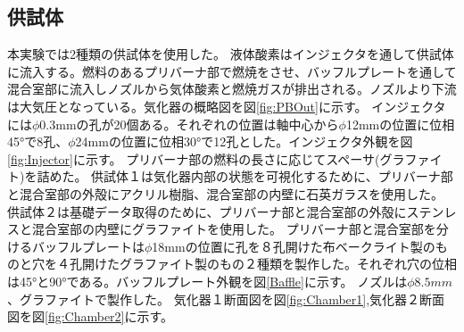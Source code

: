 \subsection{供試体}
本実験では2種類の供試体を使用した。
液体酸素はインジェクタを通して供試体に流入する。燃料のあるプリバーナ部で燃焼をさせ、バッフルプレートを通して混合室部に流入しノズルから気体酸素と燃焼ガスが排出される。ノズルより下流は大気圧となっている。気化器の概略図を図\ref{fig:PBOut}に示す。
インジェクタには$\phi$0.3mmの孔が20個ある。それぞれの位置は軸中心から$\phi$12mmの位置に位相45°で8孔、$\phi$24mmの位置に位相30°で12孔とした。インジェクタ外観を図\ref{fig:Injector}に示す。
プリバーナ部の燃料の長さに応じてスペーサ(グラファイト)を詰めた。
供試体１は気化器内部の状態を可視化するために、プリバーナ部と混合室部の外殻にアクリル樹脂、混合室部の内壁に石英ガラスを使用した。
供試体２は基礎データ取得のために、プリバーナ部と混合室部の外殻にステンレスと混合室部の内壁にグラファイトを使用した。
プリバーナ部と混合室部を分けるバッフルプレートは$\phi$18mmの位置に孔を８孔開けた布ベークライト製のものと穴を４孔開けたグラファイト製のもの２種類を製作した。それぞれ穴の位相は45°と90°である。バッフルプレート外観を図\ref{Baffle}に示す。
ノズルは$\phi8.5mm$、グラファイトで製作した。
気化器１断面図を図\ref{fig:Chamber1},気化器２断面図を図\ref{fig:Chamber2}に示す。




